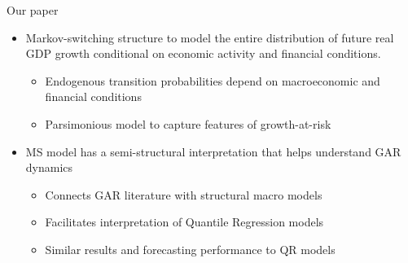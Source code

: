 \documentclass[xcolor=dvipsnames, xcolor=table, 10pt]{beamer}
\newcommand{\rr}[1]{{\color{darkred}#1}}
\begin{document}
\begin{frame}{Our paper}
\vspace*{0.12in}
\begin{itemize}
\item Markov-switching structure to model the \rr{entire} distribution of future real GDP growth \rr{conditional on economic activity and financial conditions}.
\medskip
     \begin{itemize}
     \item Endogenous transition probabilities depend on macroeconomic and financial conditions
\medskip
     \item Parsimonious model to capture features of growth-at-risk
\end{itemize}
\bigskip
\item MS model has a semi-structural interpretation that helps understand GAR dynamics
       \medskip
       \begin{itemize}
         \item Connects GAR literature with structural macro models
           \medskip
         \item Facilitates interpretation of Quantile Regression models
           \medskip
         \item Similar results and forecasting performance to QR models
       \end{itemize}

\end{itemize}
\end{frame}

\end{document}
